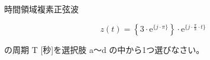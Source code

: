 時間領域複素正弦波

\[
z(t) =  \left \{ 3 \cdot \textrm{e}^{\{j \cdot \pi \}} \right \} \cdot \textrm{e}^{\{ j \cdot \frac{\pi}{8} \cdot t \}}
\]

\bigskip
\noindent の周期 $\textrm{T}$ [秒]を選択肢 a〜d の中から1つ選びなさい。
